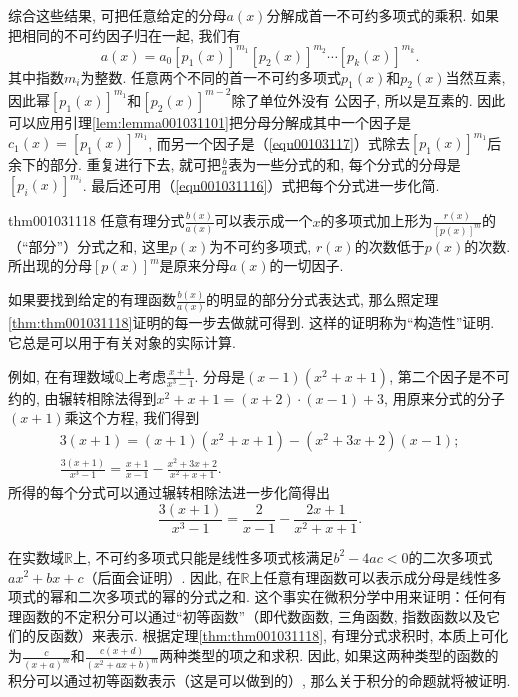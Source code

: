 综合这些结果, 可把任意给定的分母$a(x)$分解成首一不可约多项式的乘积. 如果把相同的不可约因子归在一起, 我们有
\begin{equation}\label{equ001031117}
a(x)=a_0[p_1(x)]^{m_1}[p_2(x)]^{m_2}\cdots[p_k(x)]^{m_k}.
\end{equation}
其中指数$m_i$为整数. 任意两个不同的首一不可约多项式$p_1(x)$和$p_2(x)$当然互素, 因此幂$[p_1(x)]^{m_1}$和$[p_2(x)]^{m-2}$除了单位外没有 公因子, 所以是互素的. 因此可以应用引理\ref{lem:lemma001031101}把分母分解成其中一个因子是$c_1(x) = [p_1(x)]^{m_1}$, 而另一个因子是（\ref{equ00103117}）式除去$[p_1(x)]^{m_1}$后余下的部分. 重复进行下去, 就可把$\frac{b}{a}$表为一些分式的和, 每个分式的分母是$[p_i(x)]^{m_i}$. 最后还可用（\ref{equ001031116}）式把每个分式进一步化简. 

\begin{theorem}{}{thm001031118}
任意有理分式$\frac{b(x)}{a(x)}$可以表示成一个$x$的多项式加上形为$\frac{r(x)}{[p(x)]^m}$的（“部分”）分式之和, 这里$p(x)$为不可约多项式, $r(x)$的次数低于$p(x)$的次数. 所出现的分母$[p(x)]^m$是原来分母$a(x)$的一切因子. 
\end{theorem}

如果要找到给定的有理函数$\frac{b(x)}{a(x)}$的明显的部分分式表达式, 那么照定理\ref{thm:thm001031118}证明的每一步去做就可得到. 这样的证明称为“构造性”证明. 它总是可以用于有关对象的实际计算. 

例如, 在有理数域$\mathbb{Q}$上考虑$\frac{x+1}{x^3-1}$. 分母是$(x-1)(x^2+x+1)$, 第二个因子是不可约的, 由辗转相除法得到$x^2+x+1 = (x+2) \cdot (x-1) + 3$, 用原来分式的分子$(x+1)$乘这个方程, 我们得到
\begin{gather*}
3(x+1) = (x+1)(x^2+x+1)- (x^2 + 3x + 2)(x-1);\\
\frac{3(x+1)}{x^3-1} = \frac{x+1}{x-1} - \frac{x^2+3x+2}{x^2+x+1}.
\end{gather*}
所得的每个分式可以通过辗转相除法进一步化简得出
\[
\frac{3(x+1)}{x^3-1} = \frac{2}{x-1} - \frac{2x+1}{x^2+x+1}.
\]

在实数域$\mathbb{R}$上, 不可约多项式只能是线性多项式核满足$b^2-4ac<0$的二次多项式$ax^2+bx+c$（后面会证明）. 因此, 在$\mathbb{R}$上任意有理函数可以表示成分母是线性多项式的幂和二次多项式的幂的分式之和. 这个事实在微积分学中用来证明：任何有理函数的不定积分可以通过“初等函数”（即代数函数, 三角函数, 指数函数以及它们的反函数）来表示. 根据定理\ref{thm:thm001031118}, 有理分式求积时, 本质上可化为$\frac{c}{(x+a)^m}$和$\frac{c(x+d)}{(x^2+ax+b)^m}$两种类型的项之和求积. 因此, 如果这两种类型的函数的积分可以通过初等函数表示（这是可以做到的）, 那么关于积分的命题就将被证明. 

